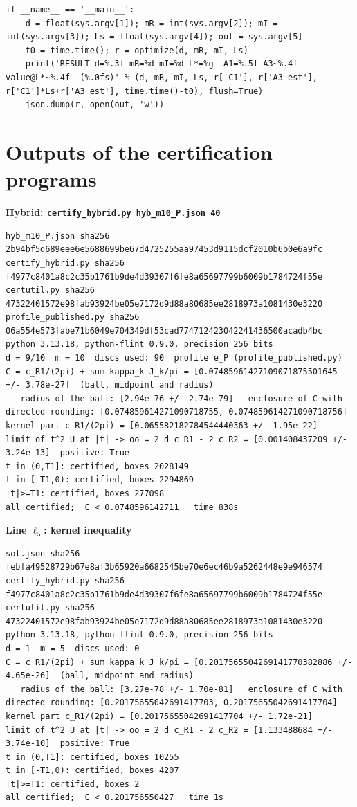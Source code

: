 \documentclass[11pt,reqno]{amsart}
\numberwithin{equation}{section}
\theoremstyle{definition}
\theoremstyle{remark}
\newcommand{\appsub}[1]{\par\medskip\noindent\textbf{#1}\par\nobreak\smallskip}
\begin{document}
\begin{lstlisting}
if __name__ == '__main__':
    d = float(sys.argv[1]); mR = int(sys.argv[2]); mI = int(sys.argv[3]); Ls = float(sys.argv[4]); out = sys.argv[5]
    t0 = time.time(); r = optimize(d, mR, mI, Ls)
    print('RESULT d=%.3f mR=%d mI=%d L*=%g  A1=%.5f A3~%.4f  value@L*~%.4f  (%.0fs)' % (d, mR, mI, Ls, r['C1'], r['A3_est'], r['C1']*Ls+r['A3_est'], time.time()-t0), flush=True)
    json.dump(r, open(out, 'w'))
\end{lstlisting}
\clearpage
\section{Outputs of the certification programs}\label{app:cert}
\appsub{Hybrid: \texttt{certify\_hybrid.py hyb\_m10\_P.json 40}}
\label{app:out_hybrid}
\begin{lstlisting}
hyb_m10_P.json sha256 2b94bf5d689eee6e5688699be67d4725255aa97453d9115dcf2010b6b0e6a9fc
certify_hybrid.py sha256 f4977c8401a8c2c35b1761b9de4d39307f6fe8a65697799b6009b1784724f55e
certutil.py sha256 47322401572e98fab93924be05e7172d9d88a80685ee2818973a1081430e3220
profile_published.py sha256 06a554e573fabe71b6049e704349df53cad774712423042241436500acadb4bc
python 3.13.18, python-flint 0.9.0, precision 256 bits
d = 9/10  m = 10  discs used: 90  profile e_P (profile_published.py)
C = c_R1/(2pi) + sum kappa_k J_k/pi = [0.07485961427109071875501645 +/- 3.78e-27]  (ball, midpoint and radius)
   radius of the ball: [2.94e-76 +/- 2.74e-79]   enclosure of C with directed rounding: [0.074859614271090718755, 0.074859614271090718756]
kernel part c_R1/(2pi) = [0.065582182784544440363 +/- 1.95e-22]
limit of t^2 U at |t| -> oo = 2 d c_R1 - 2 c_R2 = [0.001408437209 +/- 3.24e-13]  positive: True
t in (0,T1]: certified, boxes 2028149
t in [-T1,0): certified, boxes 2294869
|t|>=T1: certified, boxes 277098
all certified;  C < 0.0748596142711   time 838s
\end{lstlisting}
\appsub{Line $\ell_{5}$: kernel inequality}
\begin{lstlisting}
sol.json sha256 febfa49528729b67e8af3b65920a6682545be70e6ec46b9a5262448e9e946574
certify_hybrid.py sha256 f4977c8401a8c2c35b1761b9de4d39307f6fe8a65697799b6009b1784724f55e
certutil.py sha256 47322401572e98fab93924be05e7172d9d88a80685ee2818973a1081430e3220
python 3.13.18, python-flint 0.9.0, precision 256 bits
d = 1  m = 5  discs used: 0 
C = c_R1/(2pi) + sum kappa_k J_k/pi = [0.2017565504269141770382886 +/- 4.65e-26]  (ball, midpoint and radius)
   radius of the ball: [3.27e-78 +/- 1.70e-81]   enclosure of C with directed rounding: [0.20175655042691417703, 0.20175655042691417704]
kernel part c_R1/(2pi) = [0.20175655042691417704 +/- 1.72e-21]
limit of t^2 U at |t| -> oo = 2 d c_R1 - 2 c_R2 = [1.133488684 +/- 3.74e-10]  positive: True
t in (0,T1]: certified, boxes 10255
t in [-T1,0): certified, boxes 4207
|t|>=T1: certified, boxes 2
all certified;  C < 0.201756550427   time 1s
\end{lstlisting}
\end{document}
